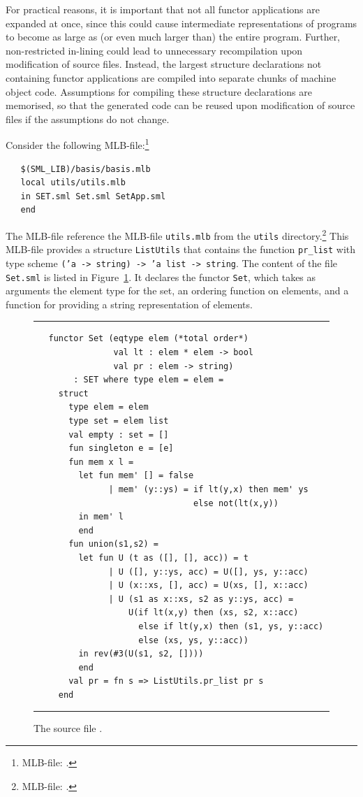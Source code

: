 \documentclass[12pt]{book}
\begin{document}
For practical reasons, it is important that not all functor
applications are expanded at once, since this could cause intermediate
representations of programs to become as large as (or even much larger
than) the entire program. Further, non-restricted in-lining could lead
to unnecessary recompilation upon modification of source files.
Instead, the largest structure declarations not containing functor
applications are compiled into separate chunks of machine object code.
Assumptions for compiling these structure declarations are memorised,
so that the generated code can be reused upon modification of source
files if the assumptions do not change.

Consider the following MLB-file:\footnote{MLB-file:
  .}
\begin{verbatim}
   $(SML_LIB)/basis/basis.mlb
   local utils/utils.mlb
   in SET.sml Set.sml SetApp.sml
   end
\end{verbatim}
The MLB-file reference the MLB-file {\tt utils.mlb} from the {\tt utils}
directory.\footnote{MLB-file: .} This
MLB-file provides a structure {\tt ListUtils} that contains the
function {\tt pr\_list} with type scheme {\tt ('a -> string) -> 'a
  list -> string}. The content of the file {\tt Set.sml} is listed in
Figure~\ref{Set.fig}. It declares the functor {\tt Set}, which takes
as arguments the element type for the set, an ordering function on
elements, and a function for providing a string representation of
elements.
\begin{figure}[ht]
\hrule \medskip
\begin{verbatim}
   functor Set (eqtype elem (*total order*)
                val lt : elem * elem -> bool
                val pr : elem -> string) 
        : SET where type elem = elem =
     struct
       type elem = elem
       type set = elem list
       val empty : set = []
       fun singleton e = [e]
       fun mem x l =
         let fun mem' [] = false
               | mem' (y::ys) = if lt(y,x) then mem' ys
                                else not(lt(x,y))
         in mem' l
         end
       fun union(s1,s2) =
         let fun U (t as ([], [], acc)) = t
               | U ([], y::ys, acc) = U([], ys, y::acc)
               | U (x::xs, [], acc) = U(xs, [], x::acc)
               | U (s1 as x::xs, s2 as y::ys, acc) =
                   U(if lt(x,y) then (xs, s2, x::acc)
                     else if lt(y,x) then (s1, ys, y::acc)
                     else (xs, ys, y::acc))
         in rev(#3(U(s1, s2, [])))
         end
       val pr = fn s => ListUtils.pr_list pr s
     end
\end{verbatim}
\caption{The source file .}
\medskip \hrule \label{Set.fig} 
\end{figure}
\end{document}
